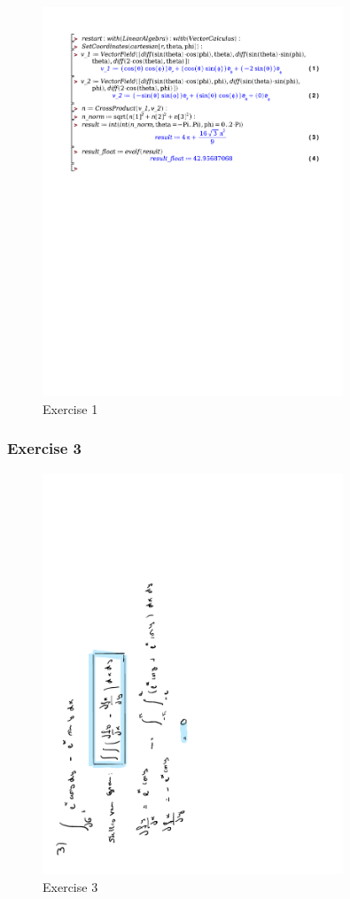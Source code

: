 \documentclass[a4paper]{report}
\begin{document}
\begin{figure}[H]
	\centering
	\includegraphics[width=0.8\textwidth]{exercises/huis_7_ex_1.pdf}
	\caption{Exercise 1}
	\label{fig:huis_7_ex_1}
\end{figure}

\subsubsection{Exercise 3}

\begin{figure}[H]
	\centering
	\includegraphics[angle=-90, width=0.8\textwidth]{assets/huis_7_ex_3.pdf}
	\caption{Exercise 3}
	\label{fig:huis_7_ex_3}
\end{figure}
\end{document}
